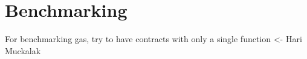 \chapter*{Benchmarking} 


For benchmarking gas, try to have contracts with only a single function <- Hari Muckalak 

    
    
    
    
    







